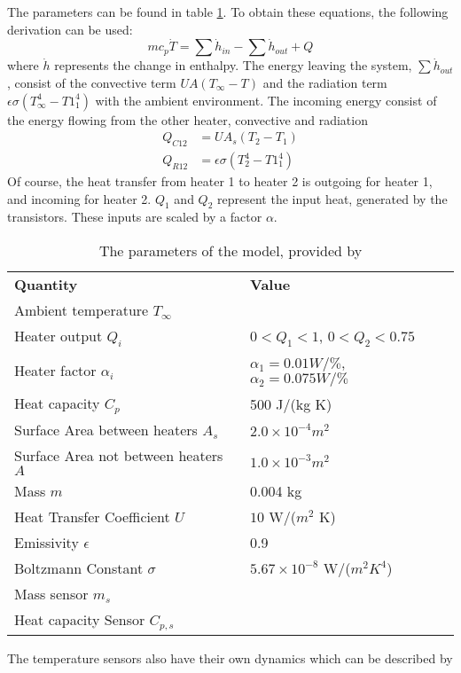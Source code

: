 The parameters can be found in table \ref{tab:theModelPara}. To obtain these equations, the following derivation can be used:
$$
    mc_p\dot{T} = \sum\dot{h}_{in} - \sum\dot{h}_{out} + Q
$$
where $\dot{h}$ represents the change in enthalpy. The energy leaving the system, $ \sum\dot{h}_{out}$, consist of the convective term  $U A (T_{\infty} - T)$ and the radiation term $\epsilon\sigma(T^4_{\infty} - T1^4_1)$ with the ambient environment. The incoming energy consist of the energy flowing from the other heater, convective and radiation
\begin{align}
    Q_{C12} &= U A_s (T_2 -T_1) \nonumber \\
    Q_{R12} &= \epsilon\sigma(T^4_{2} - T1^4_1) \nonumber
\end{align}
Of course, the heat transfer from heater 1 to heater 2 is outgoing for heater 1, and incoming for heater 2. $Q_1$ and $Q_2$ represent the input heat, generated by the transistors. These inputs are scaled by a factor $\alpha$.
\begin{table}[ht]
    \centering
    \begin{tabular}{l|l}
    \textbf{Quantity} & \textbf{Value} \\
    Ambient temperature $T_{\infty}$    & \\
    Heater output $Q_i$ & $0<Q_1<1$, $0<Q_2<0.75$\\
    Heater factor $\alpha_i$ & $\alpha_1 = 0.01W/\%$, $\alpha_2 = 0.075W/\%$ \\
    Heat capacity $C_p$ & 500 J/(kg K)\\
    Surface Area between heaters $A_s$ & $2.0\times10^{-4} m^2$\\
    Surface Area not between heaters $A$ & $1.0\times10^{-3} m^2$\\
    Mass $m$ & 0.004 kg\\
    Heat Transfer Coefficient $U$ & $10$ W/($m^2$ K) \\
    Emissivity $\epsilon$ & 0.9\\
    Boltzmann Constant $\sigma$ & $5.67\times10^{-8}$ W/($m^2 K^4$) \\
    Mass sensor $m_s$ & \\
    Heat capacity Sensor $C_{p,s}$ & \\
    \end{tabular}
    \caption{The parameters of the model, provided by \cite{APMonitor}}
    \label{tab:theModelPara}
\end{table}
The temperature sensors also have their own dynamics which can be described by
